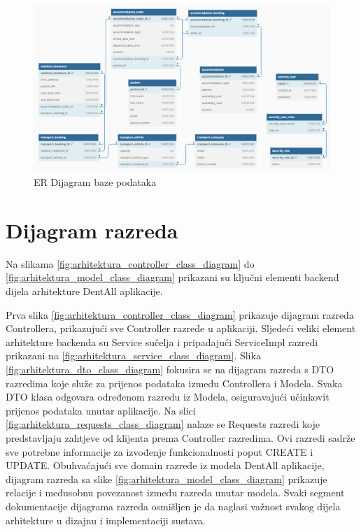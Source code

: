 				\begin{figure}[H]
					\includegraphics[scale=0.42]{slike/dijagram_baze_v2.png} %
					\centering
					\caption{ER Dijagram baze podataka}
					\label{fig:dijagram_baze_podataka}
				\end{figure}
			
			\eject
			
			
		\section{Dijagram razreda}
		
			Na slikama \ref{fig:arhitektura_controller_class_diagram}  do \ref{fig:arhitektura_model_class_diagram}  prikazani su ključni elementi backend dijela arhitekture DentAll aplikacije. 
			
			Prva slika \ref{fig:arhitektura_controller_class_diagram}  prikazuje dijagram razreda Controllera, prikazujući sve Controller razrede u aplikaciji.  Sljedeći veliki element arhitekture backenda su Service sučelja i pripadajući ServiceImpl razredi prikazani na \ref{fig:arhitektura_service_class_diagram}. Slika \ref{fig:arhitektura_dto_class_diagram} fokusira se na dijagram razreda s DTO razredima koje služe za prijenos podataka između Controllera i Modela. Svaka DTO klasa odgovara određenom razredu iz Modela, osiguravajući učinkovit prijenos podataka unutar aplikacije. Na slici \ref{fig:arhitektura_requests_class_diagram} nalaze se Requests razredi koje predstavljaju zahtjeve od klijenta prema Controller razredima. Ovi razredi sadrže sve potrebne informacije za izvođenje funkcionalnosti poput CREATE i UPDATE. Obuhvaćajući sve domain razrede iz modela DentAll aplikacije, dijagram razreda sa slike  \ref{fig:arhitektura_model_class_diagram} prikazuje relacije i međusobnu povezanost između razreda unutar modela. Svaki segment dokumentacije dijagrama razreda osmišljen je da naglasi važnost svakog dijela arhitekture u dizajnu i implementaciji sustava.
			
